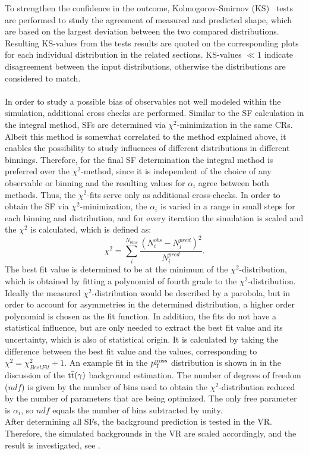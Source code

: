 To strengthen the confidence in the outcome, Kolmogorov-Smirnov (KS)~\cite{KS} tests are performed to study the agreement of measured and predicted shape, which are based on the largest deviation between the two compared distributions. Resulting KS-values from the tests results are quoted on the corresponding plots for each individual distribution in the related sections. KS-values $\ll1$ indicate disagreement between the input distributions, otherwise the distributions are considered to match.\\\\
In order to study a possible bias of observables not well modeled within the simulation, additional cross checks are performed. Similar to the SF calculation in the integral method, SFs are determined via $\chi^2$-minimization in the same CRs. Albeit this method is somewhat correlated to the method explained above, it enables the possibility to study influences of different distributions in different binnings. Therefore, for the final SF determination the integral method is preferred over the $\chi^2$-method, since it is independent of the choice of any observable or binning and the resulting values for $\alpha_i$ agree between both methods. Thus, the $\chi^2$-fits serve only as additional cross-checks. In order to obtain the SF via $\chi^2$-minimization, the $\alpha_{i}$ is varied in a range in small steps for each binning and distribution, and for every iteration the simulation is scaled and the $\chi^2$ is calculated, which is defined as:
\begin{equation}
 \chi^2=\sum_i^{N_{bins}} \frac{\left(N_{i}^{obs}-N_{i}^{pred}\right)^2}{N_{i}^{pred}}.
\end{equation}
The best fit value is determined to be at the minimum of the $\chi^2$-distribution, which is obtained by fitting a polynomial of fourth grade to the $\chi^2$-distribution. Ideally the measured $\chi^2$-distribution would be described by a parobola, but in order to account for asymmetries in the determined distribution, a higher order polynomial is chosen as the fit function. In addition, the fits do not have a statistical influence, but are only needed to extract the best fit value and its uncertainty, which is also of statistical origin. It is calculated by taking the difference between the best fit value and the values, corresponding to $\chi^2=\chi^2_{BestFit}+1$. An example fit in the $p_{\mathrm{T}}^\text{miss}$ distribution is shown in  in the discussion of the ${\mathrm{t}\overline{\mathrm{t}}}(\gamma)$ background estimation. The number of degrees of freedom ($ndf$) is given by the number of bins used to obtain the $\chi^2$-distribution reduced by the number of parameters that are being optimized. The only free parameter is $\alpha_{i}$, so $ndf$ equals the number of bins subtracted by unity.\\
After determining all SFs, the background prediction is tested in the VR. Therefore, the simulated backgrounds in the VR are scaled accordingly, and the result is investigated, see .



